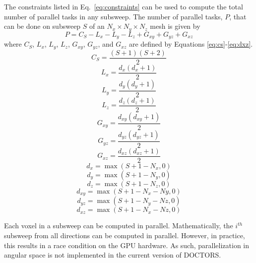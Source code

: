The constraints listed in Eq.~\ref{eq:constraints} can be used to compute the total number of parallel tasks in any subsweep. The number of parallel tasks, $P$, that can be done on subsweep $S$ of an $N_x \times N_y \times N_z$ mesh is given by
\begin{equation}\label{eq:taskspersub}
P = C_S - L_x - L_y - L_z + G_{xy} + G_{yz} + G_{xz}
\end{equation}
where $C_S$, $L_x$, $L_y$, $L_z$, $G_{xy}$, $G_{yz}$, and $G_{xz}$ are defined by Equations \ref{eq:cs}-\ref{eq:dxz}.
\begin{equation}\label{eq:cs}
C_S = \frac{(S+1)(S+2)}{2}
\end{equation}
\begin{equation}
L_x = \frac{d_x(d_x+1)}{2}
\end{equation}
\begin{equation}
L_y = \frac{d_y(d_y+1)}{2}
\end{equation}
\begin{equation}
L_z = \frac{d_z(d_z+1)}{2}
\end{equation}
\begin{equation}
G_{xy} = \frac{d_{xy}(d_{xy}+1)}{2}
\end{equation}
\begin{equation}
G_{yz} = \frac{d_{yz}(d_{yz}+1)}{2}
\end{equation}
\begin{equation}
G_{xz} = \frac{d_{xz}(d_{xz}+1)}{2}
\end{equation}
\begin{equation}
d_x = \max(S+1-N_x, 0)
\end{equation}
\begin{equation}
d_y = \max(S+1-N_y, 0)
\end{equation}
\begin{equation}
d_z = \max(S+1-N_z, 0)
\end{equation}
\begin{equation}
d_{xy} = \max(S+1-N_x - Ny, 0)
\end{equation}
\begin{equation}
d_{yz} = \max(S+1-N_y - Nz, 0)
\end{equation}
\begin{equation}\label{eq:dxz}
d_{xz} = \max(S+1-N_x - Nz, 0)
\end{equation}

Each voxel in a subsweep can be computed in parallel. Mathematically, the $i^{th}$ subsweep from all directions can be computed in parallel. However, in practice, this results in a race condition on the GPU hardware. As such, parallelization in angular space is not implemented in the current version of DOCTORS.

